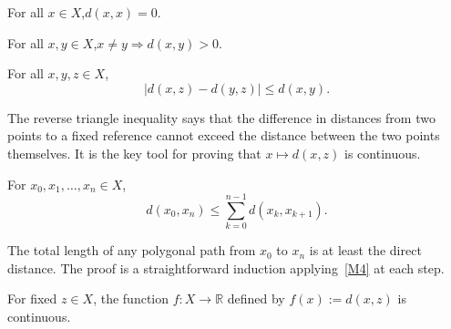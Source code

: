
\begin{proposition}
\label{prop:distance-to-itself}
For all $x \in X$,\quad $d(x,x) = 0$.
\end{proposition}

\begin{proposition}
\label{prop:positivity}
For all $x,y \in X$,\quad $x \neq y \Rightarrow d(x,y) > 0$.
\end{proposition}


\begin{proposition}
\label{prop:reverse-triangle}
For all $x,y,z \in X$,
\[
|d(x,z) - d(y,z)| \le d(x,y).
\]
\end{proposition}

\begin{remark*}[Intuition]
The reverse triangle inequality says that the difference in distances
from two points to a fixed reference cannot exceed the distance between
the two points themselves.
It is the key tool for proving that $x \mapsto d(x,z)$ is continuous.
\end{remark*}

\begin{proposition}
\label{prop:generalised-triangle}
For $x_0, x_1, \dots, x_n \in X$,
\[
d(x_0, x_n) \le \sum_{k=0}^{n-1} d(x_k, x_{k+1}).
\]
\end{proposition}

\begin{remark*}[Intuition]
The total length of any polygonal path from $x_0$ to $x_n$
is at least the direct distance.
The proof is a straightforward induction applying~\ref{M4} at each step.
\end{remark*}


\begin{proposition}
\label{prop:continuity-of-distance}
For fixed $z \in X$, the function $f : X \to \mathbb{R}$ defined by
$f(x) := d(x,z)$ is continuous.
\end{proposition}

